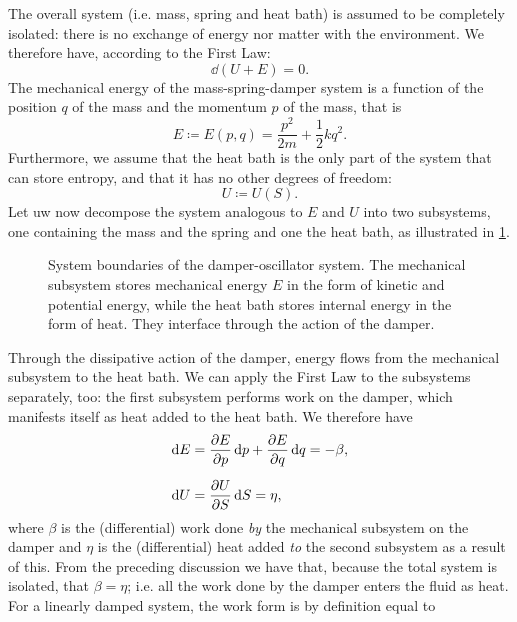 The overall system (i.e. mass, spring and heat bath) is assumed to be completely isolated: there is no exchange of energy nor matter with the environment. We therefore have, according to the First Law:
\begin{equation}
    \dd{(U + E)} = 0. 
    \label{eq:dho_first_law}
\end{equation}
The mechanical energy of the mass-spring-damper system is a function of the position $q$ of the mass and the momentum $p$ of the mass, that is
\begin{equation}
    E \coloneq E(p, q) = \frac{p^2}{2m} + \frac{1}{2}kq^2. 
    \label{eq:dho_mech_energy}
\end{equation}
Furthermore, we assume that the heat bath is the only part of the system that can store entropy, and that it has no other degrees of freedom:
\begin{equation}
    U \coloneq U(S).  
    \label{eq:dho_int_energy}
\end{equation}
Let uw now decompose the system analogous to $E$ and $U$ into two subsystems, one containing the mass and the spring and one the heat bath, as illustrated in \cref{fig:oscillator_thermo}. 
\begin{figure}[ht!]
    \centering
    
    \caption{System boundaries of the damper-oscillator system. The mechanical subsystem stores mechanical energy $E$ in the form of kinetic and potential energy, while the heat bath stores internal energy in the form of heat. They interface through the action of the damper.}
    \label{fig:oscillator_thermo}
\end{figure}
Through the dissipative action of the damper, energy flows from the mechanical subsystem to the heat bath. We can apply the First Law to the subsystems separately, too: the first subsystem performs work on the damper, which manifests itself as heat added to the heat bath. We therefore have
\begin{equation}
    \begin{split}
        \dd{E} &= \pdv{E}{p}\dd{p} + \pdv{E}{q}\dd{q} = -\beta, \\[0.2cm]
        \dd{U} &= \pdv{U}{S}\dd{S} = \eta, \\
    \end{split}
\end{equation}
where $\beta$ is the (differential) work done \emph{by} the mechanical subsystem on the damper and $\eta$ is the (differential) heat added \emph{to} the second subsystem as a result of this. From the preceding discussion we have that, because the total system is isolated, that $ \beta = \eta $; i.e. all the work done by the damper enters the fluid as heat. For a linearly damped system, the work form is by definition equal to 
